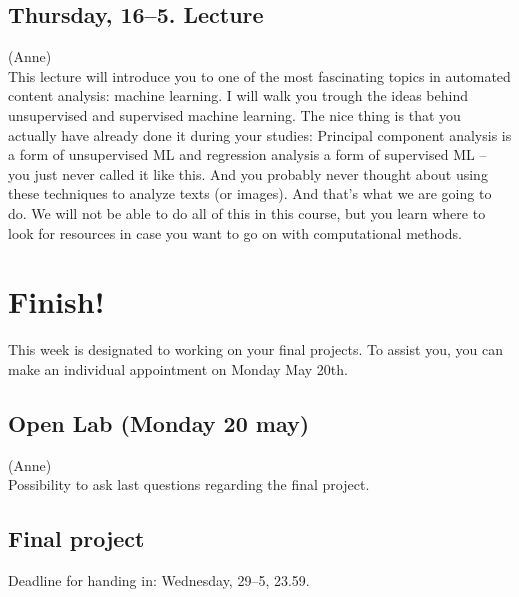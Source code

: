 \documentclass[a4paper,10pt]{report}
\begin{document}
\subsection*{Thursday, 16--5. Lecture}

{\footnotesize{(Anne)}\\}
This lecture will introduce you to one of the most fascinating topics in automated content analysis: machine learning. I will walk you trough the ideas behind unsupervised and supervised machine learning. The nice thing is that you actually have already done it during your studies: Principal component analysis is a form of unsupervised ML and regression analysis a form of supervised ML -- you just never called it like this. And you probably never thought about using these techniques to analyze texts (or images). And that's what we are going to do.
We will not be able to do all of this in this course, but you learn where to look for resources in case you want to go on with computational methods.

\section*{Finish!}
This week is designated to working on your final projects. To assist you, you can make an individual appointment on Monday May 20th.

\subsection*{Open Lab (Monday 20 may)}
{\footnotesize{(Anne)}\\}
Possibility to ask last questions regarding the final project.

\subsection*{Final project}
Deadline for handing in: Wednesday, 29--5, 23.59.




 
 
 
\end{document}
